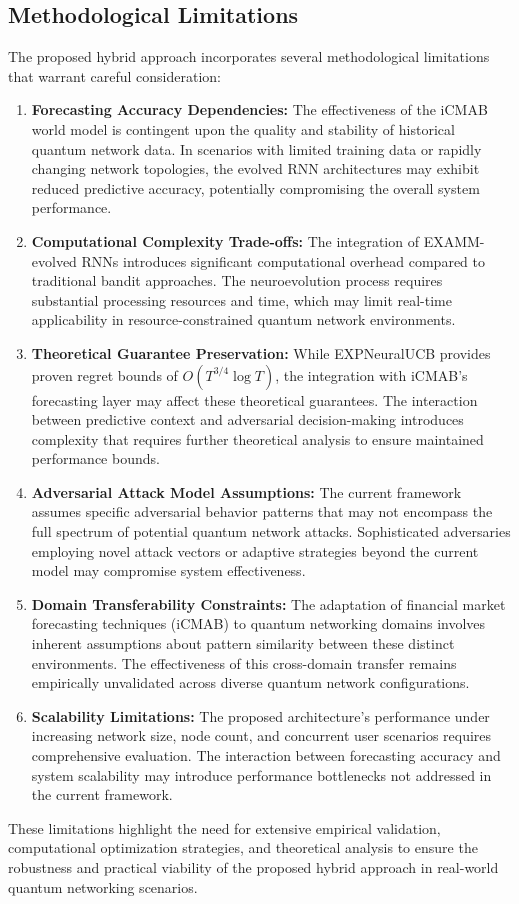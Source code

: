 \subsection{Methodological Limitations}

The proposed hybrid approach incorporates several methodological limitations that warrant careful consideration:

\begin{enumerate}
    \item \textbf{Forecasting Accuracy Dependencies:} The effectiveness of the iCMAB world model is contingent upon the quality and stability of historical quantum network data. In scenarios with limited training data or rapidly changing network topologies, the evolved RNN architectures may exhibit reduced predictive accuracy, potentially compromising the overall system performance.
    
    \item \textbf{Computational Complexity Trade-offs:} The integration of EXAMM-evolved RNNs introduces significant computational overhead compared to traditional bandit approaches. The neuroevolution process requires substantial processing resources and time, which may limit real-time applicability in resource-constrained quantum network environments.
    
    \item \textbf{Theoretical Guarantee Preservation:} While EXPNeuralUCB provides proven regret bounds of $O(T^{3/4} \log T)$, the integration with iCMAB's forecasting layer may affect these theoretical guarantees. The interaction between predictive context and adversarial decision-making introduces complexity that requires further theoretical analysis to ensure maintained performance bounds.
    
    \item \textbf{Adversarial Attack Model Assumptions:} The current framework assumes specific adversarial behavior patterns that may not encompass the full spectrum of potential quantum network attacks. Sophisticated adversaries employing novel attack vectors or adaptive strategies beyond the current model may compromise system effectiveness.
    
    \item \textbf{Domain Transferability Constraints:} The adaptation of financial market forecasting techniques (iCMAB) to quantum networking domains involves inherent assumptions about pattern similarity between these distinct environments. The effectiveness of this cross-domain transfer remains empirically unvalidated across diverse quantum network configurations.
    
    \item \textbf{Scalability Limitations:} The proposed architecture's performance under increasing network size, node count, and concurrent user scenarios requires comprehensive evaluation. The interaction between forecasting accuracy and system scalability may introduce performance bottlenecks not addressed in the current framework.
\end{enumerate}

These limitations highlight the need for extensive empirical validation, computational optimization strategies, and theoretical analysis to ensure the robustness and practical viability of the proposed hybrid approach in real-world quantum networking scenarios.